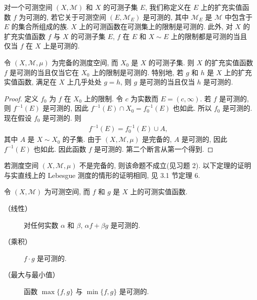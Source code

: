 \documentclass[../../main.tex]{subfiles}
\begin{document}
对一个可测空间 $(X,\mathcal{M})$ 和 $X$ 的可测子集 $E$, 我们称定义在 $E$ 上的扩充实值函数 $f$ 为可测的, 若它关于可测空间 $(E,\mathcal{M}_{E})$ 是可测的, 其中 $\mathcal{M}_{E}$ 是 $\mathcal{M}$ 中包含于 $E$ 的集合所组成的族. $X$ 上的可测函数在可测集上的限制是可测的. 此外, 对 $X$ 的扩充实值函数 $f$ 与 $X$ 的可测子集 $E$, $f$ 在 $E$ 和 $X\sim E$ 上的限制都是可测的当且仅当 $f$ 在 $X$ 上是可测的.

\begin{proposition}\label{proposition:ch18-restriction}
令 $(X,\mathcal{M},\mu)$ 为完备的测度空间, 而 $X_{0}$ 是 $X$ 的可测子集. 则 $X$ 的扩充实值函数 $f$ 是可测的当且仅当它在 $X_{0}$ 上的限制是可测的. 特别地, 若 $g$ 和 $h$ 是 $X$ 上的扩充实值函数, 满足在 $X$ 上几乎处处 $g=h$, 则 $g$ 是可测的当且仅当 $h$ 是可测的.
\end{proposition}

\begin{proof}
定义 $f_{0}$ 为 $f$ 在 $X_{0}$ 上的限制. 令 $c$ 为实数而 $E=(c,\infty)$. 若 $f$ 是可测的, 则 $f^{-1}(E)$ 是可测的, 因此 $f^{-1}(E)\cap X_{0}=f_{0}^{-1}(E)$ 也如此. 所以 $f_{0}$ 是可测的. 现在假设 $f_{0}$ 是可测的. 则
\begin{align*}
f^{-1}(E)=f_{0}^{-1}(E)\cup A,
\end{align*}
其中 $A$ 是 $X\sim X_{0}$ 的子集. 由于 $(X,\mathcal{M},\mu)$ 是完备的, $A$ 是可测的, 因此 $f^{-1}(E)$ 也如此. 因此函数 $f$ 是可测的. 第二个断言从第一个得到.
\end{proof}

若测度空间 $(X,\mathcal{M},\mu)$ 不是完备的, 则该命题不成立(见习题 2). 以下定理的证明与实直线上的 Lebesgue 测度的情形的证明相同, 见 3.1 节定理 6.

\begin{theorem}\label{theorem:ch18-algebra-measurable}
令 $(X,\mathcal{M})$ 为可测空间, 而 $f$ 和 $g$ 是 $X$ 上的可测实值函数.
\begin{description}
\item[（线性）] 对任何实数 $\alpha$ 和 $\beta$, $\alpha f+\beta g$ 是可测的.
\item[（乘积）] $f\cdot g$ 是可测的.
\item[（最大与最小值）] 函数 $\max\{f,g\}$ 与 $\min\{f,g\}$ 是可测的.
\end{description}
\end{theorem}
\end{document}
